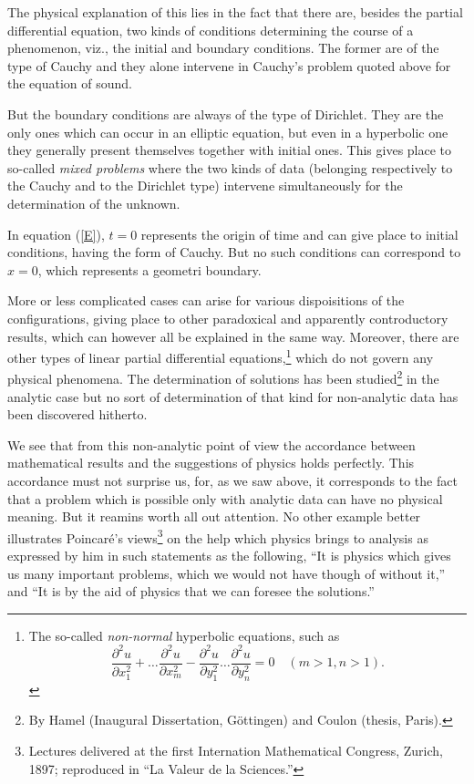 \documentclass[12pt,oneside]{book}
\newcommand{\iit}[1]{\textit{#1}}
\begin{document}
The physical explanation of this lies in the fact that there are, besides the partial differential equation, two kinds of conditions determining the course of a phenomenon, viz., the initial and boundary conditions. The former are of the type of Cauchy and they alone intervene in Cauchy's problem quoted above for the equation of sound. \par

But the boundary conditions are always of the type of Dirichlet. They are the only ones which can occur in an elliptic equation, but even in a hyperbolic one they generally present themselves together with initial ones. This gives place to so-called \iit{mixed problems} where the two kinds of data (belonging respectively to the Cauchy and to the Dirichlet type) intervene simultaneously for the determination of the unknown. \par

In equation (\ref{E}), $t=0$ represents the origin of time and can give place to initial conditions, having the form of Cauchy. But no such conditions can correspond to $x=0$, which represents a geometri boundary. \par

More or less complicated cases can arise for various dispoisitions of the configurations, giving place to other paradoxical and apparently controductory results, which can however all be explained in the same way. Moreover, there are other types of linear partial differential equations,\footnote{The so-called \iit{non-normal} hyperbolic equations, such as
\begin{equation*}
    \frac{\partial^2u}{\partial x_1^2}+\dots \frac{\partial^2u}{\partial x_m^2} - \frac{\partial^2u}{\partial y_1^2}\dots \frac{\partial^2u}{\partial y_n^2}=0 \quad (m>1,n>1).
\end{equation*} }
which do not govern any physical phenomena. The determination of solutions has been studied\footnote{By Hamel (Inaugural Dissertation, G\"ottingen) and Coulon (thesis, Paris).} in the analytic case but no sort of determination of that kind for non-analytic data has been discovered hitherto. \par

We see that from this non-analytic point of view the accordance between mathematical results and the suggestions of physics holds perfectly. This accordance must not surprise us, for, as we saw above, it corresponds to the fact that a problem which is possible only with analytic data can have no physical meaning. But it reamins worth all out attention. No other example better illustrates Poincar\'e's views\footnote{Lectures delivered at the first Internation Mathematical Congress, Zurich, 1897; reproduced in ``La Valeur de la Sciences.''} on the help which physics brings to analysis as expressed by him in such statements as the following, ``It is physics which gives us many important problems, which we would not have though of without it,'' and ``It is by the aid of physics that we can foresee the solutions.'' \par
\end{document}
